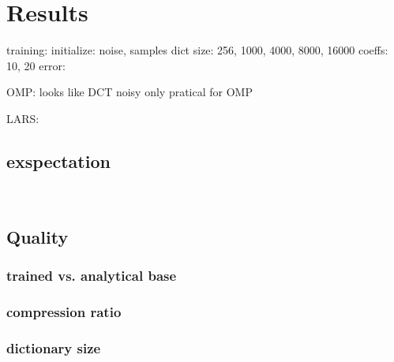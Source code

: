 \chapter{Results}

training:
  initialize: noise, samples 
  dict size: 256, 1000, 4000, 8000, 16000 
  coeffs: 10, 20
  error:

OMP:
  looks like DCT 
  noisy
  only pratical for OMP

LARS:
  

\section{exspectation}
\
\section{Quality}
\subsection{trained vs. analytical base}
\subsection{compression ratio}
\subsection{dictionary size}




